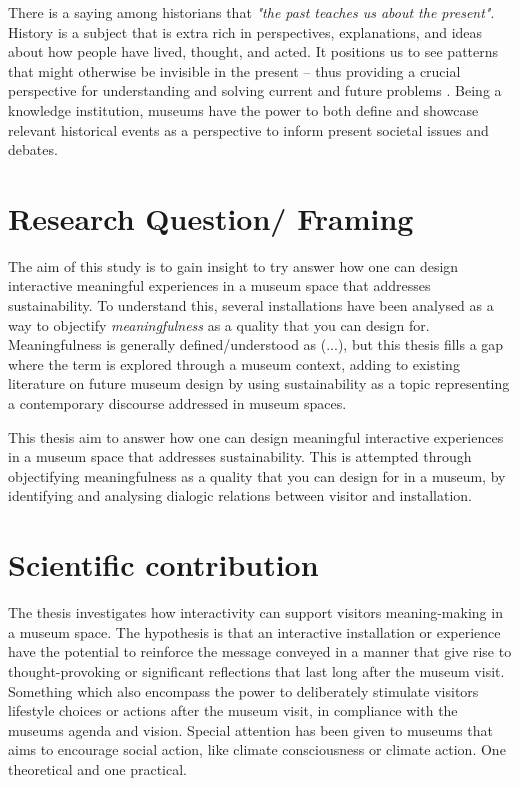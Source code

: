 There is a saying among historians that \emph{"the past teaches us about the present"}. History is a subject that is extra rich in perspectives, explanations, and ideas about how people have lived, thought, and acted. It positions us to see patterns that might otherwise be invisible in the present – thus providing a crucial perspective for understanding and solving current and future problems \autocite{UW_website}. Being a knowledge institution, museums have the power to both define and showcase relevant historical events as a perspective to inform present societal issues and debates. 



\section{Research Question/ Framing}
The aim of this study is to gain insight to try answer how one can design interactive meaningful experiences in a museum space that addresses sustainability. To understand this, several installations have been analysed as a way to objectify \emph{meaningfulness} as a quality that you can design for. Meaningfulness is generally defined/understood as (...), but this thesis fills a gap where the term is explored through a museum context, adding to existing literature on future museum design by using sustainability as a topic representing a contemporary discourse addressed in museum spaces.

This thesis aim to answer how one can design meaningful interactive experiences in a museum space that addresses sustainability. This is attempted through objectifying meaningfulness as a quality that you can design for in a museum, by identifying and analysing dialogic relations between visitor and installation.

\section{Scientific contribution}
The thesis investigates how interactivity can support visitors meaning-making in a museum space. The hypothesis is that an interactive installation or experience have the potential to reinforce the message conveyed in a manner that give rise to thought-provoking or significant reflections that last long after the museum visit. Something which also encompass the power to deliberately stimulate visitors lifestyle choices or actions after the museum visit, in compliance with the museums agenda and vision. Special attention has been given to museums that aims to encourage social action, like climate consciousness or climate action.
One theoretical and one practical.

